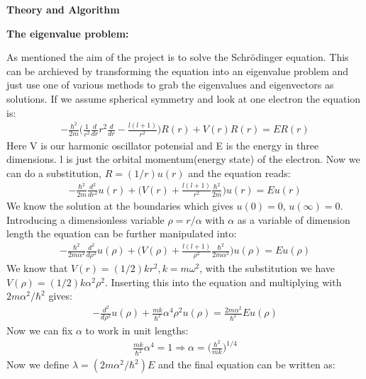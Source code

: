 \documentclass[11pt, a4 paper]{report}
\newenvironment{tabbed}{\begin{addmargin}{0.1cm}}{\end{addmargin}}
\newcommand{\sectiontitle}[1]{\begin{center} \Large\textbf{{#1}} \end{center}}
\newcommand{\sectionundertitle}[1]{\hspace{-0.5cm} \textbf{{#1}}}
\begin{document}
\sectiontitle{Theory and Algorithm}
    \sectionundertitle{The eigenvalue problem:}
        \begin{tabbed}
            As mentioned the aim of the project is to solve the Schrödinger equation. This can be archieved by transforming the equation into an eigenvalue problem and just use one of various methods to grab the eigenvalues and eigenvectors as solutions. If we assume spherical symmetry and look at one electron the equation is:
            \begin{align*}
                -\frac{\hbar^2}{2m}\bigg(\frac{1}{r^2}\frac{d}{dr}r^2\frac{d}{dr} - \frac{l(l+1)}{r^2}\bigg)R(r) + V(r)R(r) = ER(r)
            \end{align*}
            Here V is our harmonic oscillator potensial and E is the energy in three dimensions. l is just the orbital momentum(energy state) of the electron. Now we can do a substitution, $R=(1/r)u(r)$ and the equation reads:
            \begin{align*}
                -\frac{\hbar^2}{2m}\frac{d^2}{dr^2}u(r) + \bigg(V(r) + \frac{l(l+1)}{r^2}\frac{\hbar^2}{2m}\bigg)u(r) = Eu(r)
            \end{align*} 
            We know the solution at the boundaries which gives $u(0)=0$, $u(\infty)=0$. Introducing a dimensionless variable $\rho=r/\alpha$ with $\alpha$ as a variable of dimension length the equation can be further manipulated into:
            \begin{align*}
                -\frac{\hbar^2}{2m\alpha^2}\frac{d^2}{d\rho^2}u(\rho) + \bigg(V(\rho) + \frac{l(l+1)}{\rho^2}\frac{\hbar^2}{2m\alpha^2}\bigg)u(\rho) = Eu(\rho)
            \end{align*}
            We know that $V(r)=(1/2)kr^2, k=m\omega^2$, with the substitution we have $V(\rho)=(1/2)k\alpha^2\rho^2$. Inserting this into the equation and multiplying with $2m\alpha^2/\hbar^2$ gives:
            \begin{align*}
                -\frac{d^2}{d\rho^2}u(\rho) + \frac{mk}{\hbar^2}\alpha^4\rho^2u(\rho) = \frac{2m\alpha^2}{\hbar^2}Eu(\rho)
            \end{align*}
            Now we can fix $\alpha$ to work in unit lengths:
            \begin{align*}
                \frac{mk}{\hbar^2}\alpha^4 = 1 \Rightarrow \alpha = \bigg(\frac{\hbar^2}{mk}\bigg)^{1/4}
            \end{align*}
            Now we define $\lambda=(2m\alpha^2/\hbar^2)E$ and the final equation can be written as:

\end{tabbed}
\end{document}
